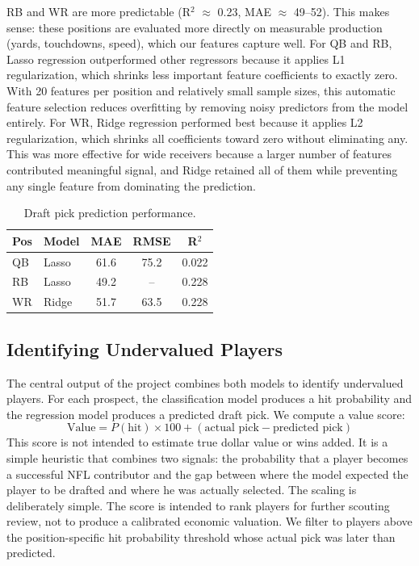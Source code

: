 \documentclass[10pt,twocolumn]{article}
\begin{document}
RB and WR are more predictable (R$^2$ $\approx$ 0.23, MAE $\approx$ 49--52). This makes sense: these positions are evaluated more directly on measurable production (yards, touchdowns, speed), which our features capture well. For QB and RB, Lasso regression outperformed other regressors because it applies L1 regularization, which shrinks less important feature coefficients to exactly zero. With 20 features per position and relatively small sample sizes, this automatic feature selection reduces overfitting by removing noisy predictors from the model entirely. For WR, Ridge regression performed best because it applies L2 regularization, which shrinks all coefficients toward zero without eliminating any. This was more effective for wide receivers because a larger number of features contributed meaningful signal, and Ridge retained all of them while preventing any single feature from dominating the prediction.

\begin{table}[H]
\centering
\small
\begin{tabular}{llccc}
\toprule
Pos & Model & MAE & RMSE & R$^2$ \\
\midrule
QB & Lasso & 61.6 & 75.2 & 0.022 \\
RB & Lasso & 49.2 & -- & 0.228 \\
WR & Ridge & 51.7 & 63.5 & 0.228 \\
\bottomrule
\end{tabular}
\caption{Draft pick prediction performance.}
\label{tab:draft}
\end{table}

\subsection{Identifying Undervalued Players}

The central output of the project combines both models to identify undervalued players. For each prospect, the classification model produces a hit probability and the regression model produces a predicted draft pick. We compute a value score:
\[
\text{Value} = P(\text{hit}) \times 100 + (\text{actual pick} - \text{predicted pick})
\]
This score is not intended to estimate true dollar value or wins added. It is a simple heuristic that combines two signals: the probability that a player becomes a successful NFL contributor and the gap between where the model expected the player to be drafted and where he was actually selected. The scaling is deliberately simple. The score is intended to rank players for further scouting review, not to produce a calibrated economic valuation. We filter to players above the position-specific hit probability threshold whose actual pick was later than predicted.
\end{document}
